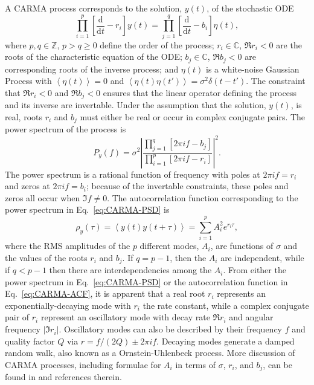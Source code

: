 \documentclass[modern]{aastex61}
\newcommand{\dd}{\mathrm{d}}
\newcommand{\diff}[2]{\frac{\dd #1}{\dd #2}}
\begin{document}
A CARMA process corresponds to the solution, $y(t)$, of the stochastic ODE
%
\begin{equation}
  \label{eq:GP-definition}
  \prod_{i=1}^{p} \left[ \diff{}{t} - r_i \right] y(t) =
  \prod_{j = 1}^{q} \left[ \diff{}{t} - b_i \right] \eta(t),
\end{equation}
%
where $p, q \in \mathbb{Z}$, $p > q \geq 0$ define the order of the process;
$r_i \in \mathbb{C}$, $\Re r_i < 0$ are the roots of the characteristic equation
of the ODE; $b_j \in \mathbb{C}$, $\Re b_j < 0$ are corresponding roots of the
inverse process; and $\eta(t)$ is a white-noise Gaussian Process with
$\left\langle \eta(t) \right\rangle = 0$ and $\left\langle \eta(t) \eta(t')
\right\rangle = \sigma^2 \delta\left(t - t' \right)$.  The constraint that $\Re
r_i < 0$ and $\Re b_j < 0$ ensures that the linear operator defining the process
and its inverse are invertable.  Under the assumption that the solution, $y(t)$,
is real, roots $r_i$ and $b_j$ must either be real or occur in complex conjugate
pairs.  The power spectrum of the process is
%
\begin{equation}
  \label{eq:CARMA-PSD}
  P_y(f) = \sigma^2 \left| \frac{\prod_{j=1}^q \left[ 2 \pi i f - b_j \right]}{\prod_{i=1}^p \left[ 2 \pi i f - r_i \right]} \right|^2.
\end{equation}
%
The power spectrum is a rational function of frequency with poles at $2\pi i f =
r_i$ and zeros at $2\pi i f = b_i$; because of the invertable constraints, these
poles and zeros all occur when $\Im f \neq 0$.  The autocorrelation function
corresponding to the power spectrum in Eq.\ \eqref{eq:CARMA-PSD} is
%
\begin{equation}
  \label{eq:CARMA-ACF}
  \rho_y (\tau) = \left\langle y\left( t \right) y \left( t + \tau \right) \right\rangle = \sum_{i=1}^p A_i^2 e^{r_i \tau},
\end{equation}
%
where the RMS amplitudes of the $p$ different modes, $A_i$, are functions of
$\sigma$ and the values of the roots $r_i$ and $b_j$.  If $q = p-1$, then the
$A_i$ are independent, while if $q < p-1$ then there are interdependencies among
the $A_i$.  From either the power spectrum in Eq.\ \eqref{eq:CARMA-PSD} or the
autocorrelation function in Eq.\ \eqref{eq:CARMA-ACF}, it is apparent that a
real root $r_i$ represents an exponentially-decaying mode with $r_i$ the rate
constant, while a complex conjugate pair of $r_i$ represent an oscillatory mode
with decay rate $\Re r_i$ and angular frequency $\left|\Im r_i\right|$.
Oscillatory modes can also be described by their frequency $f$ and quality
factor $Q$ via $r = f/(2Q) \pm 2\pi i f$.  Decaying modes generate a damped
random walk, also known as a Ornstein-Uhlenbeck process.  More discussion of CARMA processes, including formulae for $A_i$ in terms of $\sigma$, $r_i$, and $b_j$, can be found in \citet{Kelly2014} and references therein.
\end{document}
